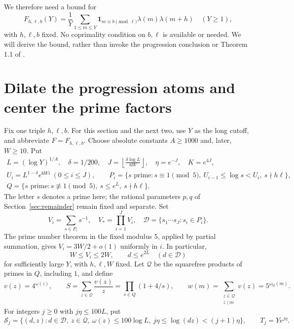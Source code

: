\documentclass[11pt,a4paper]{article}
\numberwithin{equation}{section}
\theoremstyle{remark}\newtheorem{remark}[theorem]{Remark}
\newcommand{\1}{\mathbf 1}
\begin{document}
We therefore need a bound for
\begin{equation}\label{eq:F}
 F_{h,\ell,b}(Y)=\frac1Y\sum_{1\le m\le Y}
 \1_{m\equiv b\pmod\ell}\lambda(m)\lambda(m+h)
 \quad(Y\ge1),
\end{equation}
with $h,\ell,b$ fixed. No coprimality condition on $b,\ell$ is available
or needed. We will derive the bound, rather than invoke the progression
conclusion or Theorem 1.1 of \cite{final}.

\section{Dilate the progression atoms and center the prime factors}
\label{sec:center}

Fix one triple $h,\ell,b$. For this section and the next two, use $Y$
as the long cutoff, and abbreviate $F=F_{h,\ell,b}$. Choose absolute
constants $A\ge1000$ and, later, $W\ge10$. Put
\begin{equation}\label{eq:parameters}
 \begin{gathered}
 L=(\log Y)^{1/A},\quad \delta=1/200,\quad
 J=\left\lfloor\frac{\delta\log L}{6W}\right\rfloor,\quad
 \eta=e^{-J},\quad K=e^{4J},\\
 U_i=L^{1-\delta}e^{6Wi}\ (0\le i\le J),\qquad
 P_i=\{s\text{ prime}:s\equiv1\pmod5,\ U_{i-1}\le\log s<U_i,
                         \ s\nmid h\ell\},\\
 Q=\{s\text{ prime}:s\not\equiv1\pmod5,\ s\le e^L,\ s\nmid h\ell\}.
 \end{gathered}
\end{equation}
The letter $s$ denotes a prime here; the rational parameters $p,q$
of Section~\ref{sec:remainder} remain fixed and separate. Set
\[
 V_i=\sum_{s\in P_i}s^{-1},\quad V_* =\prod_{i=1}^J V_i,\quad
 \mathcal D=\{s_1\cdots s_J:s_i\in P_i\}.
\]
The prime number theorem in the fixed modulus $5$, applied by partial
summation, gives $V_i=3W/2+o(1)$ uniformly in $i$. In particular,
\begin{equation}\label{eq:masses}
 W\le V_i\le2W,\qquad d\le e^{2L}\quad(d\in\mathcal D)
\end{equation}
for sufficiently large $Y$, with $h,\ell,W$ fixed. Let $\mathcal Q$
be the squarefree products of primes in $Q$, including $1$, and define
\[
 v(z)=4^{\omega(z)},\qquad
 S=\sum_{z\in\mathcal Q}\frac{v(z)}z=\prod_{s\in Q}(1+4/s),\qquad
 w(m)=\sum_{\substack{z\in\mathcal Q\\z\mid m}}v(z)=5^{\omega_Q(m)}.
\]
For integers $j\ge0$ with $j\eta\le100L$, put
\begin{equation}\label{eq:bins}
 \mathcal S_j=\{(d,z):d\in\mathcal D,\ z\in\mathcal Q,
  \ \omega(z)\le100\log L,\ j\eta\le\log(dz)<(j+1)\eta\},
 \qquad T_j=Ye^{j\eta}.
\end{equation}
\end{document}
